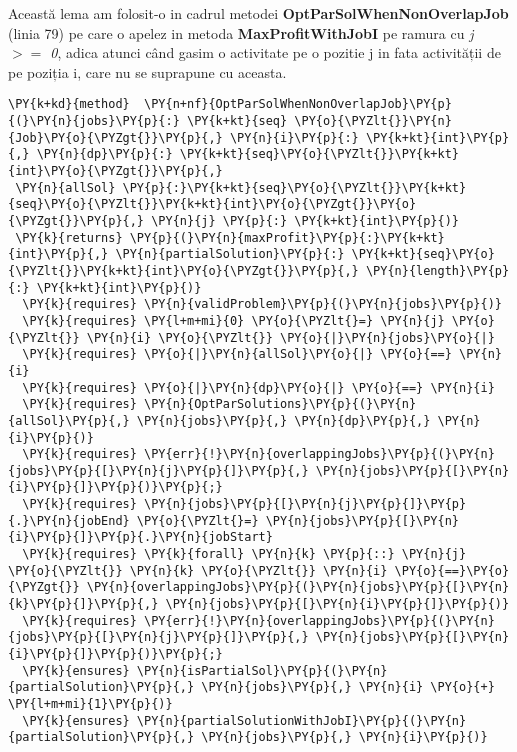 Această lema am folosit-o in cadrul metodei \textbf{OptParSolWhenNonOverlapJob} (linia 79) pe care o apelez in metoda \textbf{MaxProfitWithJobI}  pe ramura cu \textit{j $>=$ 0}, adica atunci când gasim o activitate pe o pozitie j in fata activității de pe poziția i, care nu se suprapune cu aceasta. 
\begin{Verbatim}[commandchars=\\\{\}, fontsize=\small]
\PY{k+kd}{method}  \PY{n+nf}{OptParSolWhenNonOverlapJob}\PY{p}{(}\PY{n}{jobs}\PY{p}{:} \PY{k+kt}{seq} \PY{o}{\PYZlt{}}\PY{n}{Job}\PY{o}{\PYZgt{}}\PY{p}{,} \PY{n}{i}\PY{p}{:} \PY{k+kt}{int}\PY{p}{,} \PY{n}{dp}\PY{p}{:} \PY{k+kt}{seq}\PY{o}{\PYZlt{}}\PY{k+kt}{int}\PY{o}{\PYZgt{}}\PY{p}{,}
 \PY{n}{allSol} \PY{p}{:}\PY{k+kt}{seq}\PY{o}{\PYZlt{}}\PY{k+kt}{seq}\PY{o}{\PYZlt{}}\PY{k+kt}{int}\PY{o}{\PYZgt{}}\PY{o}{\PYZgt{}}\PY{p}{,} \PY{n}{j} \PY{p}{:} \PY{k+kt}{int}\PY{p}{)}
 \PY{k}{returns} \PY{p}{(}\PY{n}{maxProfit}\PY{p}{:}\PY{k+kt}{int}\PY{p}{,} \PY{n}{partialSolution}\PY{p}{:} \PY{k+kt}{seq}\PY{o}{\PYZlt{}}\PY{k+kt}{int}\PY{o}{\PYZgt{}}\PY{p}{,} \PY{n}{length}\PY{p}{:} \PY{k+kt}{int}\PY{p}{)}
  \PY{k}{requires} \PY{n}{validProblem}\PY{p}{(}\PY{n}{jobs}\PY{p}{)}
  \PY{k}{requires} \PY{l+m+mi}{0} \PY{o}{\PYZlt{}=} \PY{n}{j} \PY{o}{\PYZlt{}} \PY{n}{i} \PY{o}{\PYZlt{}} \PY{o}{|}\PY{n}{jobs}\PY{o}{|}
  \PY{k}{requires} \PY{o}{|}\PY{n}{allSol}\PY{o}{|} \PY{o}{==} \PY{n}{i}
  \PY{k}{requires} \PY{o}{|}\PY{n}{dp}\PY{o}{|} \PY{o}{==} \PY{n}{i}
  \PY{k}{requires} \PY{n}{OptParSolutions}\PY{p}{(}\PY{n}{allSol}\PY{p}{,} \PY{n}{jobs}\PY{p}{,} \PY{n}{dp}\PY{p}{,} \PY{n}{i}\PY{p}{)}
  \PY{k}{requires} \PY{err}{!}\PY{n}{overlappingJobs}\PY{p}{(}\PY{n}{jobs}\PY{p}{[}\PY{n}{j}\PY{p}{]}\PY{p}{,} \PY{n}{jobs}\PY{p}{[}\PY{n}{i}\PY{p}{]}\PY{p}{)}\PY{p}{;}
  \PY{k}{requires} \PY{n}{jobs}\PY{p}{[}\PY{n}{j}\PY{p}{]}\PY{p}{.}\PY{n}{jobEnd} \PY{o}{\PYZlt{}=} \PY{n}{jobs}\PY{p}{[}\PY{n}{i}\PY{p}{]}\PY{p}{.}\PY{n}{jobStart}
  \PY{k}{requires} \PY{k}{forall} \PY{n}{k} \PY{p}{::} \PY{n}{j} \PY{o}{\PYZlt{}} \PY{n}{k} \PY{o}{\PYZlt{}} \PY{n}{i} \PY{o}{==}\PY{o}{\PYZgt{}} \PY{n}{overlappingJobs}\PY{p}{(}\PY{n}{jobs}\PY{p}{[}\PY{n}{k}\PY{p}{]}\PY{p}{,} \PY{n}{jobs}\PY{p}{[}\PY{n}{i}\PY{p}{]}\PY{p}{)} 
  \PY{k}{requires} \PY{err}{!}\PY{n}{overlappingJobs}\PY{p}{(}\PY{n}{jobs}\PY{p}{[}\PY{n}{j}\PY{p}{]}\PY{p}{,} \PY{n}{jobs}\PY{p}{[}\PY{n}{i}\PY{p}{]}\PY{p}{)}\PY{p}{;}
  \PY{k}{ensures} \PY{n}{isPartialSol}\PY{p}{(}\PY{n}{partialSolution}\PY{p}{,} \PY{n}{jobs}\PY{p}{,} \PY{n}{i} \PY{o}{+} \PY{l+m+mi}{1}\PY{p}{)}
  \PY{k}{ensures} \PY{n}{partialSolutionWithJobI}\PY{p}{(}\PY{n}{partialSolution}\PY{p}{,} \PY{n}{jobs}\PY{p}{,} \PY{n}{i}\PY{p}{)}

\end{Verbatim}
